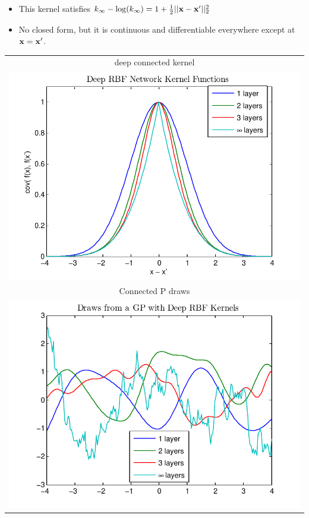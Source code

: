 \documentclass[landscape,a0b,final,a4resizeable]{include/a0poster}
\makeatletter
\newlength{\nonHumbleHeight}
\def\@humbleformat#1{{\settoheight{\nonHumbleHeight}{#1}\resizebox{!}{0.94\nonHumbleHeight}{#1}}}%
\def\humble#1{\@humbleformat{#1}}%
\newcommand{\gp}{{\humble GP}}
\makeatother
\begin{document}
\begin{poster}
\begin{multicols}{3}
\begin{minipage}[c]{0.6\columnwidth}
\begin{itemize}
\item This kernel satisfies $k_\infty - \log(k_\infty) = 1 + \frac{1}{2} || {\bf{x}} - {\bf{x}}' ||_2^2$
\item No closed form, but it is continuous and differentiable everywhere except at ${\bf{x}} = {\bf{x}}'$.
\end{itemize}
\end{minipage}
\begin{minipage}[c]{0.39\columnwidth}
\begin{centering}
\begin{tabular}{c}
deep connected kernel \\
\hspace{-0.5cm}\includegraphics[width=\columnwidth, clip, trim = 0cm 0cm 1cm 0.61cm]{../figures/deep_kernel_connected} \\
Connected \gp{} draws \\
\hspace{-0.5cm}\includegraphics[width=\columnwidth, clip, trim = 0cm 0cm 1cm 0.61cm]{../figures/deep_kernel_connected_draws}

\end{tabular}
\end{centering}
\end{minipage}
\end{multicols}
\end{poster}
\end{document}
